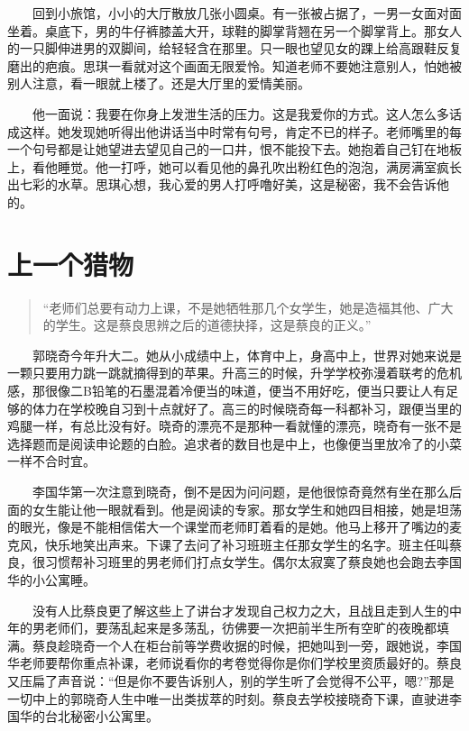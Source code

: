 \documentclass[12pt,UTF8]{ctexbook}
\begin{document}
　　回到小旅馆，小小的大厅散放几张小圆桌。有一张被占据了，一男一女面对面坐着。桌底下，男的牛仔裤膝盖大开，球鞋的脚掌背翘在另一个脚掌背上。那女人的一只脚伸进男的双脚间，给轻轻含在那里。只一眼也望见女的踝上给高跟鞋反复磨出的疤痕。思琪一看就对这个画面无限爱怜。知道老师不要她注意别人，怕她被别人注意，看一眼就上楼了。还是大厅里的爱情美丽。

　　他一面说：我要在你身上发泄生活的压力。这是我爱你的方式。这人怎么多话成这样。她发现她听得出他讲话当中时常有句号，肯定不已的样子。老师嘴里的每一个句号都是让她望进去望见自己的一口井，恨不能投下去。她抱着自己钉在地板上，看他睡觉。他一打呼，她可以看见他的鼻孔吹出粉红色的泡泡，满房满室疯长出七彩的水草。思琪心想，我心爱的男人打呼噜好美，这是秘密，我不会告诉他的。

\hypertarget{ux4e0aux4e00ux4e2aux730eux7269}{%
\section*{上一个猎物}\label{ux4e0aux4e00ux4e2aux730eux7269}}

\begin{quote}
\enquote{老师们总要有动力上课，不是她牺牲那几个女学生，她是造福其他、广大的学生。这是蔡良思辨之后的道德抉择，这是蔡良的正义。}
\end{quote}

　　郭晓奇今年升大二。她从小成绩中上，体育中上，身高中上，世界对她来说是一颗只要用力跳一跳就摘得到的苹果。升高三的时候，升学学校弥漫着联考的危机感，那很像二B铅笔的石墨混着冷便当的味道，便当不用好吃，便当只要让人有足够的体力在学校晚自习到十点就好了。高三的时候晓奇每一科都补习，跟便当里的鸡腿一样，有总比没有好。晓奇的漂亮不是那种一看就懂的漂亮，晓奇有一张不是选择题而是阅读申论题的白脸。追求者的数目也是中上，也像便当里放冷了的小菜一样不合时宜。

　　李国华第一次注意到晓奇，倒不是因为问问题，是他很惊奇竟然有坐在那么后面的女生能让他一眼就看到。他是阅读的专家。那女学生和她四目相接，她是坦荡的眼光，像是不能相信偌大一个课堂而老师盯着看的是她。他马上移开了嘴边的麦克风，快乐地笑出声来。下课了去问了补习班班主任那女学生的名字。班主任叫蔡良，很习惯帮补习班里的男老师们打点女学生。偶尔太寂寞了蔡良她也会跑去李国华的小公寓睡。

　　没有人比蔡良更了解这些上了讲台才发现自己权力之大，且战且走到人生的中年的男老师们，要荡乱起来是多荡乱，彷佛要一次把前半生所有空旷的夜晚都填满。蔡良趁晓奇一个人在柜台前等学费收据的时候，把她叫到一旁，跟她说，李国华老师要帮你重点补课，老师说看你的考卷觉得你是你们学校里资质最好的。蔡良又压扁了声音说：\enquote{但是你不要告诉别人，别的学生听了会觉得不公平，嗯?}那是一切中上的郭晓奇人生中唯一出类拔萃的时刻。蔡良去学校接晓奇下课，直驶进李国华的台北秘密小公寓里。
\end{document}

